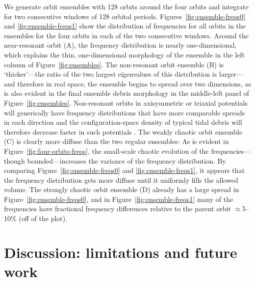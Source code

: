 \documentclass[letterpaper,12pt,preprint]{aastex}
\newcommand{\chchchanges}[1]{{\color{red} {#1}}}
\begin{document}
We generate orbit ensembles with 128 orbits around the four orbits and integrate for two consecutive windows of 128 orbital periods. Figures~\ref{fig:ensemble-freqs0} and \ref{fig:ensemble-freqs1} show the distribution of frequencies for all orbits in the ensembles for the four orbits in each of the two consecutive windows. Around the near-resonant orbit (A), the frequency distribution is nearly one-dimensional, which explains the thin, one-dimensional morphology of the ensemble in the left column of Figure~\ref{fig:ensembles}. The non-resonant orbit ensemble (B) is `thicker'---the ratio of the two largest eigenvalues of this distribution is larger---and therefore in real space, the ensemble begins to spread over two dimensions, as is also evident in the final ensemble debris morphology in the middle-left panel of Figure~\ref{fig:ensembles}. Non-resonant orbits in axisymmetric or triaxial potentials \chchchanges{will generically have frequency distributions that have more comparable spreads in each direction} and the configuration-space density of typical tidal debris will therefore decrease faster in such potentials \citep{helmi99}. The weakly chaotic orbit ensemble (C) is clearly more diffuse than the two regular ensembles: As is evident in Figure~\ref{fig:four-orbits-freqs}, the small-scale chaotic evolution of the frequencies---though bounded---increases the variance of the frequency distribution. By comparing Figure~\ref{fig:ensemble-freqs0} and \ref{fig:ensemble-freqs1}, it appears that the frequency distribution gets more diffuse until it uniformly fills the allowed volume. The strongly chaotic orbit ensemble (D) already has a large spread in Figure~\ref{fig:ensemble-freqs0}, and in Figure~\ref{fig:ensemble-freqs1} many of the frequencies have fractional frequency differences relative to the parent orbit $\approx$5--10\% (off of the plot).

\section{Discussion: limitations and future work}\label{sec:discussion}

\end{document}
